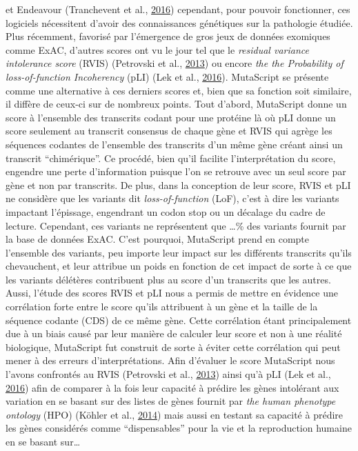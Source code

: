 \documentclass[12pt,twoside]{reedthesis}
\theoremstyle{definition}
\theoremstyle{definition}
\theoremstyle{remark}
\begin{document}
  et Endeavour (Tranchevent et al.,
  \protect\hyperlink{ref-Tranchevent2016}{2016}) cependant, pour pouvoir
  fonctionner, ces logiciels nécessitent d'avoir des connaissances
  génétiques sur la pathologie étudiée. Plus récemment, favorisé par
  l'émergence de gros jeux de données exomiques comme ExAC, d'autres
  scores ont vu le jour tel que le \emph{residual variance intolerance
  score} (RVIS) (Petrovski et al.,
  \protect\hyperlink{ref-Petrovski2013}{2013}) ou encore \emph{the the
  Probability of loss-of-function Incoherency} (pLI) (Lek et al.,
  \protect\hyperlink{ref-Lek2016}{2016}). MutaScript se présente comme une
  alternative à ces derniers scores et, bien que sa fonction soit
  similaire, il diffère de ceux-ci sur de nombreux points. Tout d'abord,
  MutaScript donne un score à l'ensemble des transcrits codant pour une
  protéine là où pLI donne un score seulement au transcrit consensus de
  chaque gène et RVIS qui agrège les séquences codantes de l'ensemble des
  transcrits d'un même gène créant ainsi un transcrit ``chimérique''. Ce
  procédé, bien qu'il facilite l'interprétation du score, engendre une
  perte d'information puisque l'on se retrouve avec un seul score par gène
  et non par transcrits. De plus, dans la conception de leur score, RVIS
  et pLI ne considère que les variants dit \emph{loss-of-function} (LoF),
  c'est à dire les variants impactant l'épissage, engendrant un codon stop
  ou un décalage du cadre de lecture. Cependant, ces variants ne
  représentent que \ldots{}\% des variants fournit par la base de données
  ExAC. C'est pourquoi, MutaScript prend en compte l'ensemble des
  variants, peu importe leur impact sur les différents transcrits qu'ils
  chevauchent, et leur attribue un poids en fonction de cet impact de
  sorte à ce que les variants délétères contribuent plus au score d'un
  transcrits que les autres. Aussi, l'étude des scores RVIS et pLI nous a
  permis de mettre en évidence une corrélation forte entre le score qu'ils
  attribuent à un gène et la taille de la séquence codante (CDS) de ce
  même gène. Cette corrélation étant principalement due à un biais causé
  par leur manière de calculer leur score et non à une réalité biologique,
  MutaScript fut construit de sorte à éviter cette corrélation qui peut
  mener à des erreurs d'interprétations. Afin d'évaluer le score
  MutaScript nous l'avons confrontés au RVIS (Petrovski et al.,
  \protect\hyperlink{ref-Petrovski2013}{2013}) ainsi qu'à pLI (Lek et al.,
  \protect\hyperlink{ref-Lek2016}{2016}) afin de comparer à la fois leur
  capacité à prédire les gènes intolérant aux variation en se basant sur
  des listes de gènes fournit par \emph{the human phenotype ontology}
  (HPO) (Köhler et al., \protect\hyperlink{ref-Kohler2014}{2014}) mais
  aussi en testant sa capacité à prédire les gènes considérés comme
  ``dispensables'' pour la vie et la reproduction humaine en se basant
  sur\ldots{}
  
\end{document}
